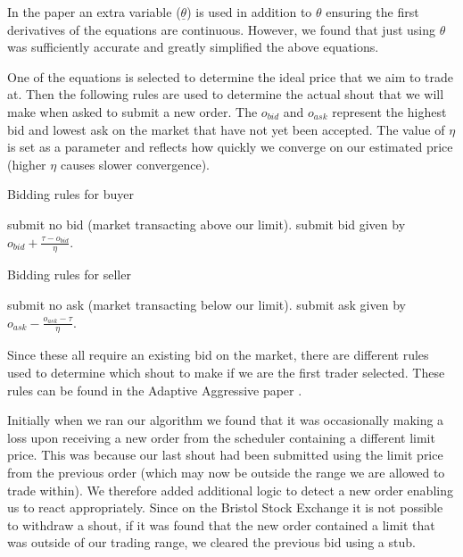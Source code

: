 \documentclass[preprint]{acm_proc_article-sp} %
\begin{document}
In the paper \cite{AA_thesis} an extra variable ($\underline \theta$) is used in addition to $\theta$ 
ensuring the first derivatives of the equations are continuous. However, we found that just using 
$\theta$ was sufficiently accurate and greatly simplified the above equations.

One of the equations is selected to determine the ideal price that we aim to
trade at. Then the following rules are used to determine the actual shout
that we will make when asked to submit a new order. The $o_{bid}$ and $o_{ask}$
represent the highest bid and lowest ask on the market that have
not yet been accepted. The value of $\eta$ is set as a parameter and reflects
how quickly we converge on our estimated price (higher $\eta$ causes slower convergence).

\begin{algorithm}[H]
    \caption{Bidding rules for buyer}
    \begin{algorithmic}
            \STATE submit no bid (market transacting above our limit).
        \ELSE
            \STATE submit bid given by $\textstyle o_{bid} + \frac{\textstyle \tau - o_{bid}}{\textstyle \eta}$.
        \ENDIF
    \end{algorithmic}
    \label{alg:bidding_rules_buyer}
\end{algorithm}

\begin{algorithm}[H]
    \caption{Bidding rules for seller}
    \begin{algorithmic}
            \STATE submit no ask (market transacting below our limit).
        \ELSE
            \STATE submit ask given by $\textstyle o_{ask} - \frac{\textstyle o_{ask}-\tau}{\textstyle \eta}$.
        \ENDIF
    \end{algorithmic}
    \label{alg:bidding_rules_seller}
\end{algorithm}

Since these all require an existing bid on the market, there are different
rules used to determine which shout to make if we are the first
trader selected. These rules can be found in the Adaptive Aggressive
paper \cite[p.~32]{AA_paper}.

Initially when we ran our algorithm we found that it was occasionally making a
loss upon receiving a new order from the scheduler containing a different limit
price. This was because our last shout had been submitted using
the limit price from the previous order (which may now be outside the range
we are allowed to trade within). We therefore added additional logic to detect a new order enabling 
us to react appropriately. Since on the Bristol Stock Exchange it is not possible to withdraw a shout, 
if it was found that the new order contained a limit that was outside of our trading range, we 
cleared the previous bid using a stub.\\
\end{document}
